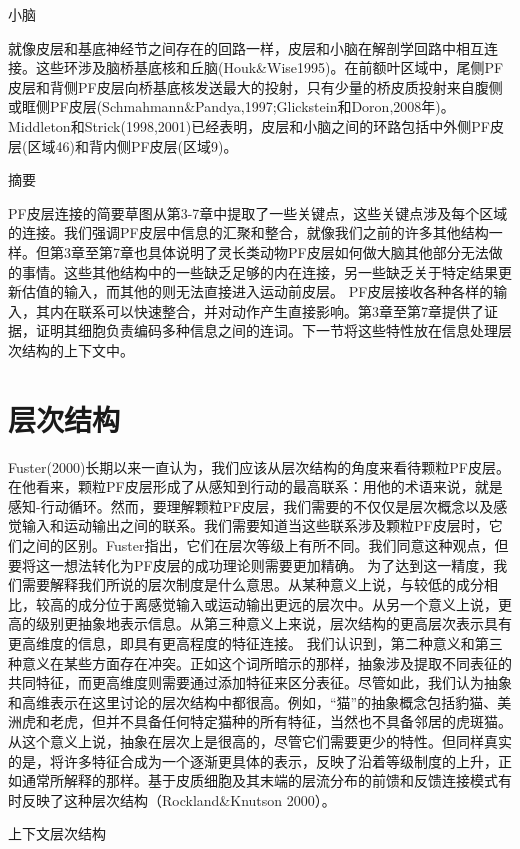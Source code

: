 小脑

就像皮层和基底神经节之间存在的回路一样，皮层和小脑在解剖学回路中相互连接。这些环涉及脑桥基底核和丘脑(Houk\&Wise1995)。在前额叶区域中，尾侧PF皮层和背侧PF皮层向桥基底核发送最大的投射，只有少量的桥皮质投射来自腹侧或眶侧PF皮层(Schmahmann\&Pandya,1997;Glickstein和Doron,2008年)。Middleton和Strick(1998,2001)已经表明，皮层和小脑之间的环路包括中外侧PF皮层(区域46)和背内侧PF皮层(区域9)。

摘要

PF皮层连接的简要草图从第3-7章中提取了一些关键点，这些关键点涉及每个区域的连接。我们强调PF皮层中信息的汇聚和整合，就像我们之前的许多其他结构一样。但第3章至第7章也具体说明了灵长类动物PF皮层如何做大脑其他部分无法做的事情。这些其他结构中的一些缺乏足够的内在连接，另一些缺乏关于特定结果更新估值的输入，而其他的则无法直接进入运动前皮层。
PF皮层接收各种各样的输入，其内在联系可以快速整合，并对动作产生直接影响。第3章至第7章提供了证据，证明其细胞负责编码多种信息之间的连词。下一节将这些特性放在信息处理层次结构的上下文中。


\section{层次结构}
Fuster(2000)长期以来一直认为，我们应该从层次结构的角度来看待颗粒PF皮层。在他看来，颗粒PF皮层形成了从感知到行动的最高联系：用他的术语来说，就是感知-行动循环。然而，要理解颗粒PF皮层，我们需要的不仅仅是层次概念以及感觉输入和运动输出之间的联系。我们需要知道当这些联系涉及颗粒PF皮层时，它们之间的区别。Fuster指出，它们在层次等级上有所不同。我们同意这种观点，但要将这一想法转化为PF皮层的成功理论则需要更加精确。
为了达到这一精度，我们需要解释我们所说的层次制度是什么意思。从某种意义上说，与较低的成分相比，较高的成分位于离感觉输入或运动输出更远的层次中。从另一个意义上说，更高的级别更抽象地表示信息。从第三种意义上来说，层次结构的更高层次表示具有更高维度的信息，即具有更高程度的特征连接。
我们认识到，第二种意义和第三种意义在某些方面存在冲突。正如这个词所暗示的那样，抽象涉及提取不同表征的共同特征，而更高维度则需要通过添加特征来区分表征。尽管如此，我们认为抽象和高维表示在这里讨论的层次结构中都很高。例如，“猫”的抽象概念包括豹猫、美洲虎和老虎，但并不具备任何特定猫种的所有特征，当然也不具备邻居的虎斑猫。从这个意义上说，抽象在层次上是很高的，尽管它们需要更少的特性。但同样真实的是，将许多特征合成为一个逐渐更具体的表示，反映了沿着等级制度的上升，正如通常所解释的那样。基于皮质细胞及其末端的层流分布的前馈和反馈连接模式有时反映了这种层次结构（Rockland\&Knutson 2000）。

上下文层次结构

